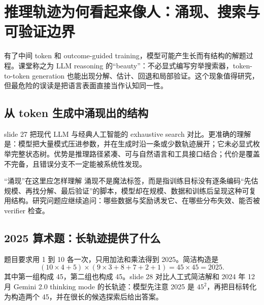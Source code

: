 \section{推理轨迹为何看起来像人：涌现、搜索与可验证边界}

有了中间 token 和 outcome-guided training，模型可能产生长而有结构的解题过程。课堂称之为 LLM reasoning 的“beauty”：不必显式编写穷举搜索器，token-to-token generation 也能出现分解、估计、回退和局部验证。这个现象值得研究，但最危险的误读是把语言表面直接当作认知同一性。

\subsection{从 token 生成中涌现出的结构}

slide 27 把现代 LLM 与经典人工智能的 exhaustive search 对比。更准确的理解是：模型把大量模式压进参数，并在生成时沿一条或少数轨迹展开；它未必显式枚举完整状态树。优势是推理路径紧凑、可与自然语言和工具接口结合；代价是覆盖不完备，且错误分支不一定能被系统性发现。



\begin{importantbox}{“涌现”在这里应怎样理解}
涌现不是魔法标签，而是指训练目标没有逐条编码“先估规模、再找分解、最后验证”的脚本，模型却在规模、数据和训练后呈现这种可复用结构。研究问题应继续追问：哪些数据与奖励诱发它、在哪些分布失效、能否被 verifier 检查。
\end{importantbox}

\subsection{2025 算术题：长轨迹提供了什么}

题目要求用 1 到 10 各一次，只用加法和乘法得到 2025。简洁构造是
\[
(10\times4+5)\times(9\times3+8+7+2+1)=45\times45=2025.
\]
其中第一组构成 45，第二组也构成 45。slide 28 对比人工式简洁解和 2024 年 12 月 Gemini 2.0 thinking mode 的长轨迹：模型先注意 2025 是 $45^2$，再把目标转化为构造两个 45，并在很长的候选探索后给出答案。


